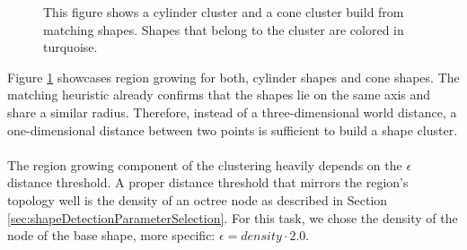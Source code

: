 \begin{figure}
\centering
{}
    \caption{This figure shows a cylinder cluster and a cone cluster build from matching shapes. Shapes that belong to the cluster are colored in turquoise.}
    \label{fig:regionGrowingConeCylinder}
\end{figure}

Figure \ref{fig:regionGrowingConeCylinder} showcases region growing for both, cylinder shapes and cone shapes. The matching heuristic already confirms that the shapes lie on the same axis and share a similar radius. Therefore, instead of a three-dimensional world distance, a one-dimensional distance between two points is sufficient to build a shape cluster. 
\\
\\
The region growing component of the clustering heavily depends on the $\epsilon$ distance threshold. A proper distance threshold that mirrors the region's topology well is the density of an octree node as described in Section \ref{sec:shapeDetectionParameterSelection}. For this task, we chose the density of the node of the base shape, more specific: $\epsilon = density \cdot 2.0$.